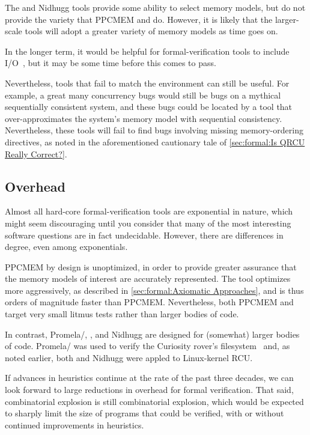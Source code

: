 The  and Nidhugg tools provide some ability to select
memory models, but do not provide the variety that PPCMEM and
 do.
However, it is likely that the larger-scale tools will adopt
a greater variety of memory models as time goes on.

In the longer term, it would be helpful for formal-verification
tools to include I/O~\cite{PaulEMcKenney2016LinuxKernelMMIO},
but it may be some time before this comes to pass.

Nevertheless, tools that fail to match the environment can still
be useful.
For example, a great many concurrency bugs would still be bugs on
a mythical sequentially consistent system, and these bugs could
be located by a tool that over-approximates the system's memory model
with sequential consistency.
Nevertheless, these tools will fail to find bugs involving missing
memory-ordering directives, as noted in the aforementioned
cautionary tale of
\cref{sec:formal:Is QRCU Really Correct?}.

\subsection{Overhead}
\label{sec:future:Overhead}

Almost all hard-core formal-verification tools are exponential
in nature, which might seem discouraging until you consider that
many of the most interesting software questions are in fact undecidable.
However, there are differences in degree, even among exponentials.

PPCMEM by design is unoptimized, in order to provide greater assurance
that the memory models of interest are accurately represented.
The  tool optimizes more aggressively, as described in
\cref{sec:formal:Axiomatic Approaches}, and is thus orders of magnitude
faster than PPCMEM\@.
Nevertheless, both PPCMEM and  target very small litmus tests
rather than larger bodies of code.

In contrast, Promela/, , and Nidhugg are designed for
(somewhat) larger bodies of code.
Promela/ was used to verify the Curiosity rover's
filesystem~\cite{DBLP:journals/amai/GroceHHJX14} and, as noted earlier,
both  and Nidhugg were appled to Linux-kernel RCU\@.

If advances in heuristics continue at the rate of the past three
decades, we can look forward to large reductions in overhead for
formal verification.
That said, combinatorial explosion is still combinatorial explosion,
which would be expected to sharply limit the size of programs that
could be verified, with or without continued improvements in
heuristics.

